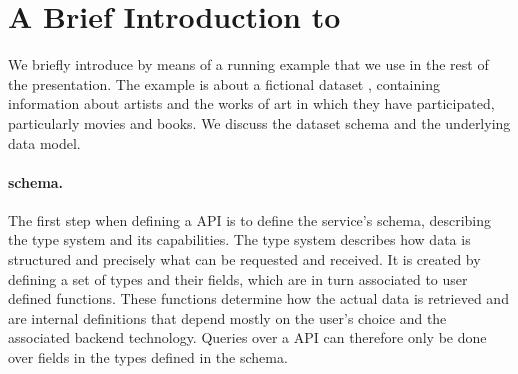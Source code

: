 \section{A Brief Introduction to \gql}\label{sec:bg}


We briefly introduce \gql by means of a running example that we use in
the rest of the presentation.  The example is about a fictional
dataset \goodbois, containing information about artists and the works of art in which they have participated, 
particularly movies and books.
We discuss the dataset schema and the underlying data model.




\paragraph{\gql schema.}
The first step when defining a \gql API is to define the service's schema, 
describing the type system and its capabilities.
The type system describes how data is structured and 
precisely what can be requested and received. 
It is created by defining a set of types and their fields, which are in turn associated to user defined functions.
These functions determine how the actual data is retrieved and are internal definitions that
depend mostly on the user's choice and the associated backend technology.
Queries over a \gql API can therefore only be done over fields in the types defined in the schema.

